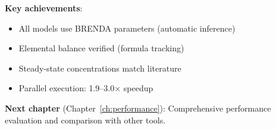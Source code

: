 \textbf{Key achievements}:

\begin{itemize}
    \item All models use BRENDA parameters (automatic inference)
    \item Elemental balance verified (formula tracking)
    \item Steady-state concentrations match literature
    \item Parallel execution: 1.9--3.0$\times$ speedup
\end{itemize}

\textbf{Next chapter} (Chapter~\ref{ch:performance}): Comprehensive performance evaluation and comparison with other tools.
